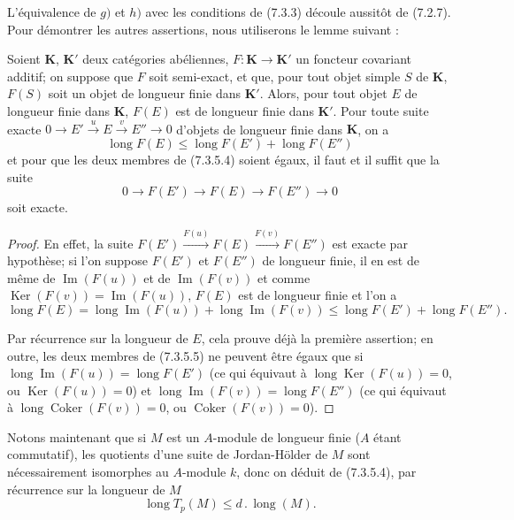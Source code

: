 L'équivalence de $g)$ et $h)$ avec les conditions de (7.3.3) découle aussitôt
de (7.2.7). Pour démontrer les autres assertions, nous utiliserons le lemme
suivant :

\begin{lemma}[7.3.5.3]
Soient $\boldsymbol{K}$, $\boldsymbol{K}'$ deux catégories abéliennes,
$F:\boldsymbol{K}\to\boldsymbol{K}'$ un foncteur
covariant additif; on suppose que $F$ soit semi-exact, et que, pour tout objet
simple $S$ de $\boldsymbol{K}$, $F(S)$ soit un objet de longueur finie dans
$\boldsymbol{K}'$. Alors, pour tout objet $E$ de longueur finie dans $\boldsymbol{K}$,
$F(E)$ est de longueur finie dans $\boldsymbol{K}'$. Pour toute suite exacte
$0\longrightarrow E'\xrightarrow{u}E\xrightarrow{v}E''\longrightarrow0$
d'objets de longueur finie dans $\boldsymbol{K}$, on a
\[
  \operatorname{long}F(E)
  \leq
  \operatorname{long}F(E')+\operatorname{long}F(E'')
  \tag{7.3.5.4}\label{III.7.3.5.4.fr}
\]
et pour que les deux membres de \textup{(7.3.5.4)} soient égaux, il faut et il suffit
que la suite
\[
  0\longrightarrow F(E')\longrightarrow F(E)\longrightarrow F(E'')
  \longrightarrow0
\]
soit exacte.
\end{lemma}

\begin{proof}
En effet, la suite
$F(E')\xrightarrow{F(u)}F(E)\xrightarrow{F(v)}F(E'')$
est exacte par hypothèse; si l'on suppose $F(E')$ et $F(E'')$ de longueur
finie, il en est de même de $\operatorname{Im}(F(u))$ et de
$\operatorname{Im}(F(v))$ et comme
$\operatorname{Ker}(F(v))=\operatorname{Im}(F(u))$, $F(E)$ est de longueur
finie et l'on a
\[
  \operatorname{long}F(E)
  =
  \operatorname{long}\operatorname{Im}(F(u))
  +
  \operatorname{long}\operatorname{Im}(F(v))
  \leq
  \operatorname{long}F(E')+\operatorname{long}F(E'').
  \tag{7.3.5.5}\label{III.7.3.5.5.fr}
\]

Par récurrence sur la longueur de $E$, cela prouve déjà la première assertion;
en outre, les deux membres de (7.3.5.5) ne peuvent être égaux que si
$\operatorname{long}\operatorname{Im}(F(u))=\operatorname{long}F(E')$
(ce qui équivaut à
$\operatorname{long}\operatorname{Ker}(F(u))=0$, ou
$\operatorname{Ker}(F(u))=0$) et
$\operatorname{long}\operatorname{Im}(F(v))=\operatorname{long}F(E'')$
(ce qui équivaut à
$\operatorname{long}\operatorname{Coker}(F(v))=0$, ou
$\operatorname{Coker}(F(v))=0$).
\end{proof}

Notons maintenant que si $M$ est un $A$-module de longueur finie ($A$ étant
commutatif), les quotients d'une suite de Jordan-Hölder de $M$ sont
nécessairement isomorphes au $A$-module $k$, donc on déduit de (7.3.5.4), par
récurrence sur la longueur de $M$
\[
  \operatorname{long}T_p(M)\leq d\mathbin{.}\operatorname{long}(M).
  \tag{7.3.5.6}\label{III.7.3.5.6.fr}
\]

